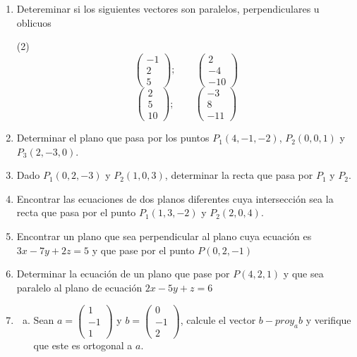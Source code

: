 \documentclass[12pt]{article}
\newenvironment{preguntas}
{\begin{enumerate}\itemsep12pt
	}
	{
	\end{enumerate}
}
\begin{document}
\begin{preguntas}
\item Detereminar si los siguientes vectores son paralelos, perpendiculares u oblicuos
\begin{tasks}(2)
\task $$ 
			\begin{pmatrix}
			-1\\
			2\\
			5
		\end{pmatrix};\qquad
			\begin{pmatrix}
			2\\
			-4\\
			-10
		\end{pmatrix}$$
\task  $$ 
			\begin{pmatrix}
			2\\
			5\\
			10
		\end{pmatrix};\qquad
			\begin{pmatrix}
			-3\\
			8\\
			-11
		\end{pmatrix}$$
\end{tasks}
\item Determinar el plano que pasa por los puntos $P_1(4,-1,-2)$, $P_2(0,0,1)$ y $P_3(2,-3,0)$.
\item Dado $P_1(0,2,-3)$ y $P_2(1,0,3)$, determinar la recta que pasa por $P_1$ y $P_2$.
\item Encontrar las ecuaciones de dos planos diferentes cuya intersección sea la recta que pasa por el punto $P_1(1,3,-2)$ y $P_2(2,0,4)$.
\item Encontrar un plano que sea perpendicular al plano cuya ecuación es $3x -7y +2z = 5$ y que pase por el punto $P(0,2,-1)$
\item Determinar la ecuación de un plano que pase por $P(4,2,1)$ y que sea paralelo al plano de ecuación $2x-5y+z=6$
\item 
\begin{enumerate}[a)]
\item Sean $a=\left(\begin{array}{r}
      1\\-1\\1
    \end{array}\right)$ y $b=\left(\begin{array}{r}
      0\\-1\\2
    \end{array}\right)$, calcule el vector\textbf{ $b-proy_a b$ }y verifique que este es ortogonal a $a$.

\end{enumerate}
\end{preguntas}
\end{document}
